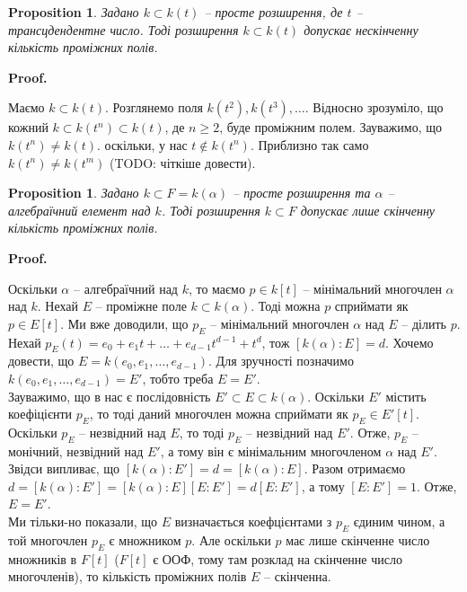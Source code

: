\documentclass[a4paper, 10pt]{article}
\makeatletter
\theoremstyle{theoremdd}
\theoremstyle{theoremdd}
\theoremstyle{theoremdd}
\theoremstyle{theoremdd}
\theoremstyle{theoremdd}
\theoremstyle{theoremdd}
\theoremstyle{theoremdd}
\theoremstyle{theoremdd}
\theoremstyle{theoremdd}
\newtheorem{proposition}[theorem]{Proposition}
\theoremstyle{theoremdd}
\theoremstyle{theoremdd}
\theoremstyle{theoremdd}
\theoremstyle{theoremdd}
\theoremstyle{theoremdd}
\theoremstyle{theoremdd}
\renewenvironment{proof}[1][Proof.\\]{\par
\pushQED{\hfill \qed}%
\normalfont \topsep6\p@\@plus6\p@\relax
\trivlist
\item\relax
{\bfseries
#1\@addpunct{.}}\hspace\labelsep\ignorespaces
}{%
\popQED\endtrivlist\@endpefalse
}
\makeatother
\begin{document}
\begin{proposition}
\label{infinite_amount_of_intermediate_fields}
Задано $k \subset k(t)$ -- просте розширення, де $t$ -- трансцдендентне число. Тоді розширення $k \subset k(t)$ допускає нескінченну кількість проміжних полів.
\end{proposition}

\begin{proof}
Маємо $k \subset k(t)$. Розглянемо поля $k(t^2),k(t^3),\dots$. Відносно зрозуміло, що кожний $k \subset k(t^n) \subset k(t)$, де $n \geq 2$, буде проміжним полем. Зауважимо, що $k(t^n) \neq k(t)$. оскільки, у нас $t \notin k(t^n)$. Приблизно так само $k(t^n) \neq k(t^m)$ (TODO: чіткіше довести).
\end{proof}

\begin{proposition}
Задано $k \subset F = k(\alpha)$ -- просте розширення та $\alpha$ -- алгебраїчний елемент над $k$. Тоді розширення $k \subset F$ допускає лише скінченну кількість проміжних полів.
\end{proposition}

\begin{proof}
Оскільки $\alpha$ -- алгебраїчний над $k$, то маємо $p \in k[t]$ -- мінімальний многочлен $\alpha$ над $k$. Нехай $E$ -- проміжне поле $k \subset k(\alpha)$. Тоді можна $p$ сприймати як $p \in E[t]$. Ми вже доводили, що $p_E$ -- мінімальний многочлен $\alpha$ над $E$ -- ділить $p$.\\
Нехай $p_E(t) = e_0 + e_1 t + \dots + e_{d-1} t^{d-1} + t^d$, тож $[k(\alpha):E] = d$. Хочемо довести, що $E = k(e_0,e_1,\dots,e_{d-1})$. Для зручності позначимо $k(e_0,e_1,\dots,e_{d-1}) = E'$, тобто треба $E = E'$.\\
Зауважимо, що в нас є послідовність $E' \subset E \subset k(\alpha)$. Оскільки $E'$ містить коефіцієнти $p_E$, то тоді даний многочлен можна сприймати як $p_E \in E'[t]$. Оскільки $p_E$ -- незвідний над $E$, то тоді $p_E$ -- незвідний над $E'$. Отже, $p_E$ -- монічний, незвідний над $E'$, а тому він є мінімальним многочленом $\alpha$ над $E'$. Звідси випливає, що $[k(\alpha) : E'] = d = [k(\alpha) : E]$. Разом отримаємо $d = [k(\alpha) : E'] = [k(\alpha) : E] [E: E'] = d [E:E']$, а тому $[E:E'] = 1$. Отже, $E = E'$.\\
Ми тільки-но показали, що $E$ визначається коефцієнтами з $p_E$ єдиним чином, а той многочлен $p_E$ є множником $p$. Але оскільки $p$ має лише скінченне число множників в $F[t]$ ($F[t]$ є ООФ, тому там розклад на скінченне число многочленів), то кількість проміжних полів $E$ -- скінченна.
\end{proof}
\end{document}
